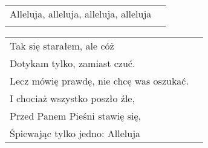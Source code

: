 \documentclass[a5paper]{article}
\begin{document}
\noindent
\begin{tabular}{@{}p{8.5cm}p{3cm}@{}}
Alleluja, alleluja, alleluja, alleluja\\\\
\end{tabular}

\noindent
\begin{tabular}{@{}p{8.5cm}p{3cm}@{}}
Tak się starałem, ale cóż\\
Dotykam tylko, zamiast czuć.\\
Lecz mówię prawdę, nie chcę was oszukać.\\
I chociaż wszystko poszło źle, \\
Przed Panem Pieśni stawię się, \\
Śpiewając tylko jedno: Alleluja
\end{tabular}
\end{document}
